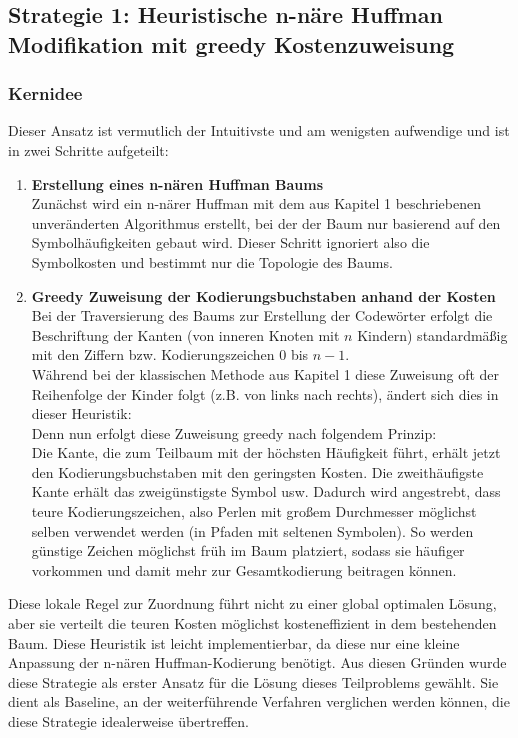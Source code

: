 \documentclass[a4paper,10pt,ngerman]{scrartcl}
\begin{document}
\subsection{Strategie 1: Heuristische n-näre Huffman Modifikation mit greedy Kostenzuweisung}
\subsubsection{Kernidee}
Dieser Ansatz ist vermutlich der Intuitivste und am wenigsten aufwendige und ist in zwei Schritte aufgeteilt: 
\\\newline
\begin{enumerate}
  \item \textbf{Erstellung eines n-nären Huffman Baums} \\
      Zunächst wird ein n-närer Huffman mit dem aus Kapitel 1 beschriebenen unveränderten Algorithmus erstellt, bei der der Baum nur basierend auf den Symbolhäufigkeiten gebaut wird. Dieser Schritt ignoriert also die Symbolkosten und bestimmt nur die Topologie des Baums. 
  \item \textbf{Greedy Zuweisung der Kodierungsbuchstaben anhand der Kosten}\\
  Bei der Traversierung des Baums zur Erstellung der Codewörter erfolgt die Beschriftung der Kanten (von inneren Knoten mit $n$ Kindern) standardmäßig mit den Ziffern bzw. Kodierungszeichen $0$ bis $n-1$.\\
  Während bei der klassischen Methode aus Kapitel 1 diese Zuweisung oft der Reihenfolge der Kinder folgt (z.B. von links nach rechts), ändert sich dies in dieser Heuristik:\\
  Denn nun erfolgt diese Zuweisung greedy nach folgendem Prinzip: \\
  Die Kante, die zum Teilbaum mit der höchsten Häufigkeit führt, erhält jetzt den Kodierungsbuchstaben mit den geringsten Kosten. Die zweithäufigste Kante erhält das zweigünstigste Symbol usw. Dadurch wird angestrebt, dass teure Kodierungszeichen, also Perlen mit großem Durchmesser möglichst selben verwendet werden (in Pfaden mit seltenen Symbolen). So werden günstige Zeichen möglichst früh im Baum platziert, sodass sie häufiger vorkommen und damit mehr zur Gesamtkodierung beitragen können.\\
\end{enumerate}
Diese lokale Regel zur Zuordnung führt nicht zu einer global optimalen Lösung, aber sie verteilt die teuren Kosten möglichst kosteneffizient in dem bestehenden Baum. Diese Heuristik ist leicht implementierbar, da diese nur eine kleine Anpassung der n-nären Huffman-Kodierung benötigt. Aus diesen Gründen wurde diese Strategie als erster Ansatz für die Lösung dieses Teilproblems gewählt. Sie dient als Baseline, an der weiterführende Verfahren verglichen werden können, die diese Strategie idealerweise übertreffen. 
\end{document}
